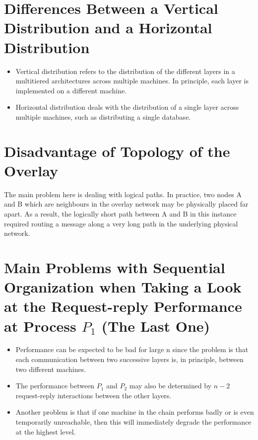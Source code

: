 \documentclass[11pt,a4paper]{report}
\begin{document}
  	\section{Differences Between a Vertical Distribution and a Horizontal Distribution}
  		\begin{itemize}
  			\item Vertical distribution refers to the distribution of the different layers in a multitiered architectures across multiple machines. In principle, each layer is implemented on a different machine.
			\item Horizontal distribution deals with the distribution of a single layer across multiple machines, such as distributing a single database.
  		\end{itemize}
  	\section{Disadvantage of Topology of the Overlay}
  	The main problem here is dealing with logical paths. In practice, two nodes A and B which are neighbours in the overlay network may be physically placed far apart. As a result, the logically short path between A and B in this instance required routing a message along a very long path in the underlying physical network.
  	\section{Main Problems with Sequential Organization when Taking a Look at the Request-reply Performance at Process $P_1$ (The Last One)}
  		\begin{itemize}
  			\item Performance can be expected to be bad for large n since the problem is that each communication between two successive layers is, in principle, between two different machines.
  			\item The performance between $P_1$ and $P_2$
may also be determined by $n-2$ request-reply interactions between the other
layers.
			\item Another problem is that if one machine in the chain performs badly or is even temporarily unreachable, then this will immediately degrade the performance at the highest level.
  		\end{itemize}
\end{document}

